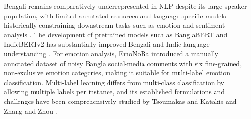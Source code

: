 \documentclass[runningheads]{llncs}
\begin{document}



Bengali remains comparatively underrepresented in NLP despite its large speaker population, with limited annotated resources and language-specific models historically constraining downstream tasks such as emotion and sentiment analysis \cite{das2010emotion}. The development of pretrained models such as BanglaBERT and IndicBERTv2 has substantially improved Bengali and Indic language understanding \cite{bhattacharjee2022banglabert,doddapaneni2023towards}. For emotion analysis, EmoNoBa \cite{islam2022emonoba} introduced a manually annotated dataset of noisy Bangla social-media comments with six fine-grained, non-exclusive emotion categories, making it suitable for multi-label emotion classification. Multi-label learning differs from multi-class classification by allowing multiple labels per instance, and its established formulations and challenges have been comprehensively studied by Tsoumakas and Katakis \cite{tsoumakas2007multi} and Zhang and Zhou \cite{zhang2014review}.
\end{document}
